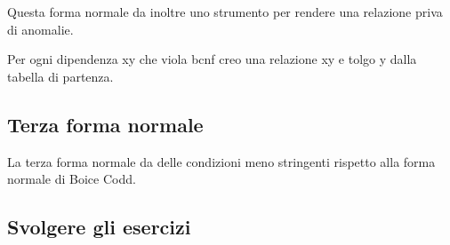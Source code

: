 Questa forma normale da inoltre uno strumento per rendere una relazione priva di anomalie.

Per ogni dipendenza xy che viola bcnf creo una relazione xy e tolgo y dalla tabella di partenza.

\subsection{Terza forma normale}

La terza forma normale da delle condizioni meno stringenti rispetto alla forma normale di Boice Codd.

\subsection{Svolgere gli esercizi}

